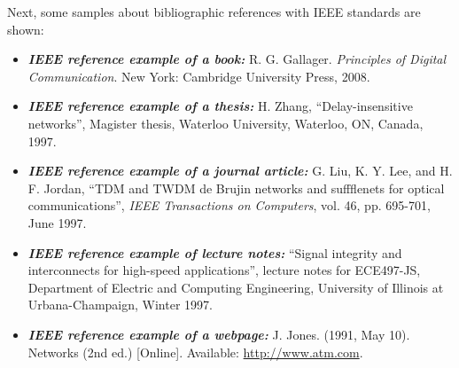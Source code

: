 \documentclass[letterpaper, 10pt, conference]{IEEEtran} %
\begin{document}
	Next, some samples about bibliographic references with IEEE standards are shown:
	\begin{itemize}
		\item \textbf{\emph{IEEE reference example of a book:}} R. G. Gallager. \textit{Principles of Digital Communication}. New York: Cambridge University Press, 2008.
		\item \textbf{\emph{IEEE reference example of a thesis:}} H. Zhang, ``Delay-insensitive networks'', Magister thesis, Waterloo University, Waterloo, ON, Canada, 1997.
		\item \textbf{\emph{IEEE reference example of a journal article:}} G. Liu, K. Y. Lee, and H. F. Jordan, ``TDM and TWDM de Brujin networks and suffflenets for optical communications'', \textit{IEEE Transactions on Computers}, vol. 46, pp. 695-701, June 1997.
		\item \textbf{\emph{IEEE reference example of lecture notes:}} ``Signal integrity and interconnects for high-speed applications'', lecture notes for ECE497-JS, Department of Electric and Computing Engineering, University of Illinois at Urbana-Champaign, Winter 1997.
		\item \textbf{\emph{IEEE reference example of a webpage:}} J. Jones. (1991, May 10). Networks (2nd ed.) [Online]. Available: \href{http://www.atm.com}{http://www.atm.com}.
	\end{itemize}
	
\end{document}
